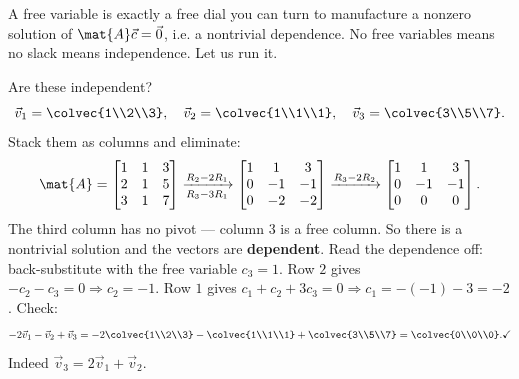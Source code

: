 A free variable is exactly a free dial you can turn to manufacture a nonzero
solution of $\mat{A}\vec{c}=\vec{0}$, i.e. a nontrivial dependence. No free
variables means no slack means independence. Let us run it.

\begin{example}
\label{ch14:ex-test3}
Are these independent?
\[
  \vec{v}_1=\colvec{1\\2\\3},\quad
  \vec{v}_2=\colvec{1\\1\\1},\quad
  \vec{v}_3=\colvec{3\\5\\7}.
\]
Stack them as columns and eliminate:
\[
  \mat{A}=\begin{bmatrix} 1 & 1 & 3\\ 2 & 1 & 5\\ 3 & 1 & 7\end{bmatrix}
  \xrightarrow[R_3-3R_1]{R_2-2R_1}
  \begin{bmatrix} 1 & 1 & 3\\ 0 & -1 & -1\\ 0 & -2 & -2\end{bmatrix}
  \xrightarrow{R_3-2R_2}
  \begin{bmatrix} 1 & 1 & 3\\ 0 & -1 & -1\\ 0 & 0 & 0\end{bmatrix}.
\]
The third column has no pivot --- column $3$ is a free column. So there is a
nontrivial solution and the vectors are \textbf{dependent}. Read the dependence
off: back-substitute with the free variable $c_3 = 1$. Row $2$ gives $-c_2 - c_3
= 0 \Rightarrow c_2 = -1$. Row $1$ gives $c_1 + c_2 + 3c_3 = 0 \Rightarrow c_1 =
-(-1) - 3 = -2$. Check:
\[
  -2\vec{v}_1 - \vec{v}_2 + \vec{v}_3
  = -2\colvec{1\\2\\3} - \colvec{1\\1\\1} + \colvec{3\\5\\7}
  = \colvec{0\\0\\0}. \checkmark
\]
Indeed $\vec{v}_3 = 2\vec{v}_1 + \vec{v}_2$.
\end{example}

